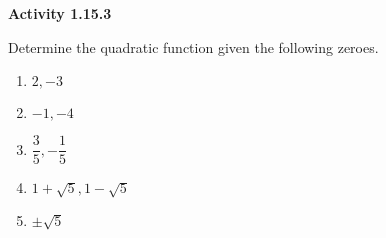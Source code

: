 \noindent\textbf{Activity 1.15.3}


Determine the quadratic function given the following zeroes. 
\begin{multicols}{3}
\begin{enumerate}[label = \color{blue}\arabic*. ]
\item $ 2, -3 $
\item $ -1, -4 $
\item $ \dfrac{3}{5}, -\dfrac{1}{5} $
\item $ 1+\sqrt{5}, 1-\sqrt{5} $
\item $ \pm\sqrt{5} $
\end{enumerate}
\end{multicols} 
